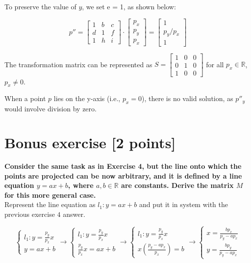 \documentclass{article}
\begin{document}
To preserve the value of $y$, we set e = 1, as shown below:

\[
    p'' = \begin{bmatrix} 1 & b & c \\ d & 1 & f \\ 1 & h & i \end{bmatrix} \cdot \begin{bmatrix} p_x \\ p_y \\ p_x \end{bmatrix} = \begin{bmatrix} 1 \\ p_y / p_x \\ 1 \end{bmatrix}
\]

The transformation matrix can be represented as $ S = \begin{bmatrix} 1 & 0 & 0 \\ 0 & 1 & 0 \\ 1 & 0 & 0 \end{bmatrix} $ for all $p_x \in \mathbb{R}$, $p_x \neq 0$.

When a point $p$ lies on the y-axis (i.e., $p_x = 0$), there is no valid solution, as $p''_y$ would involve division by zero.



\cleardoublepage
\section*{Bonus exercise [2 points]}

\textbf{Consider the same task as in Exercise 4, but the line onto which the points are projected can be now arbitrary,
    and it is defined by a line equation $y = ax + b$, where $a, b \in \mathbb{R}$ are constants. Derive the matrix $M$ for this
    more general case.} \\

Represent the line equation as $l_1 : y = ax + b$ and put it in system with the previous exercise $4$ answer.

\begin{equation*}
    \begin{cases}
        l_1: y = \frac{p_y}{p_x} x \\
        y = ax + b
    \end{cases}
    \rightarrow
    \begin{cases}
        l_1: y = \frac{p_y}{p_x} x \\
        \frac{p_y}{p_x} x = ax + b
    \end{cases}
    \rightarrow
    \begin{cases}
        l_1: y = \frac{p_y}{p_x} x \\
        x (\frac{p_y - a p_x}{p_x}) = b
    \end{cases}
    \rightarrow
    \begin{cases}
        x = \frac{bp_x}{p_y - ap_x} \\
        y = \frac{bp_y}{p_y - ap_x}
    \end{cases}
\end{equation*}
\end{document}
